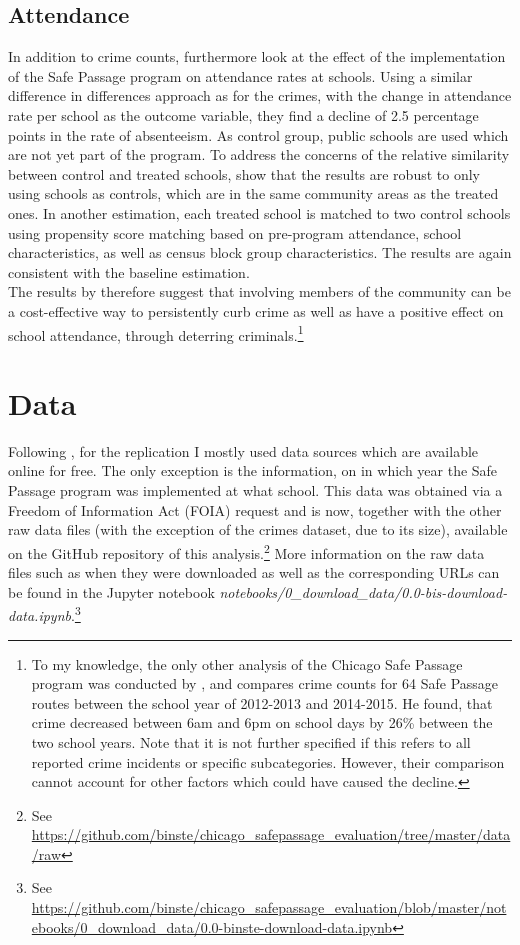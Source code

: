 \documentclass[]{article}
\begin{document}
\subsection{Attendance}
In addition to crime counts, \cite{mcmillen2017} furthermore look at the effect of the implementation of the Safe Passage program on attendance rates at schools. Using a similar difference in differences approach as for the crimes, with the change in attendance rate per school as the outcome variable, they find a decline of 2.5 percentage points in the rate of absenteeism. As control group, public schools are used which are not yet part of the program. To address the concerns of the relative similarity between control and treated schools, \cite{mcmillen2017} show that the results are robust to only using schools as controls, which are in the same community areas as the treated ones. In another estimation, each treated school is matched to two control schools using propensity score matching based on pre-program attendance, school characteristics, as well as census block group characteristics. The results are again consistent with the baseline estimation. \\

The results by \cite{mcmillen2017} therefore suggest that involving members of the community can be a cost-effective way to persistently curb crime as well as have a positive effect on school attendance, through deterring criminals.\footnote{To my knowledge, the only other analysis of the Chicago Safe Passage program was conducted by \cite{dnainfo}, and compares crime counts for 64 Safe Passage routes between the school year of 2012-2013 and 2014-2015. He found, that crime decreased between 6am and 6pm on school days by 26\% between the two school years. Note that it is not further specified if this refers to all reported crime incidents or specific subcategories. However, their comparison cannot account for other factors which could have caused the decline.}

\section{Data}
\label{sec: data}
Following \cite{mcmillen2017}, for the replication I mostly used data sources which are available online for free. The only exception is the information, on in which year the Safe Passage program was implemented at what school. This data was obtained via a Freedom of Information Act (FOIA) request and is now, together with the other raw data files (with the exception of the crimes dataset, due to its size), available on the GitHub repository of this analysis.\footnote{See \url{https://github.com/binste/chicago_safepassage_evaluation/tree/master/data/raw}} More information on the raw data files such as when they were downloaded as well as the corresponding URLs can be found in the Jupyter notebook \textit{notebooks/0\_download\_data/0.0-bis-download-data.ipynb}.\footnote{See \url{https://github.com/binste/chicago_safepassage_evaluation/blob/master/notebooks/0_download_data/0.0-binste-download-data.ipynb}} \\
\end{document}
